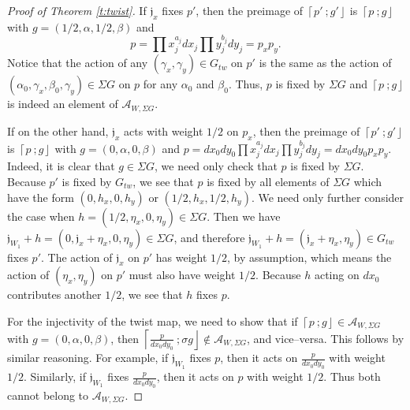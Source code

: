 \documentclass[10pt, letterpaper]{amsart}
\theoremstyle{remark}
\newcommand{\sA}{\mathscr{A}}
\newcommand{\fjrw}[2]{ \left\lceil #1 \:; #2 \right\rfloor }
\newcommand{\jw}{\mathfrak{j}}
\newcommand{\tw}[1]{{#1}_{tw}}
\newcommand{\s}[1]{\Sigma #1}
\begin{document}
\begin{proof}[Proof of Theorem \ref{t:twist}]
If $\jw_x$ fixes $p'$, then the preimage of $\fjrw{p'}{g'}$ is $\fjrw{p}{g}$ with $g=(1/2,\alpha,1/2,\beta)$ and $$p=\prod x_j^{a_j}dx_j \prod y_j^{b_j}dy_j = p_x p_y.$$ Notice that the action of any $(\gamma_x, \gamma_y) \in \tw{G}$ on $p'$ is the same as the action of $(\alpha_0,\gamma_x, \beta_0, \gamma_y)\in \s{G}$ on $p$ for any $\alpha_0$ and $\beta_0$.  Thus, $p$ is fixed by $\s{G}$ and $\fjrw{p}{g}$  is indeed an element of $\sA_{W,\s{G}}$.

If on the other hand, $\jw_x$ acts with weight $1/2$ on $p_x$, then the preimage of $\fjrw{p'}{g'}$ is $\fjrw{p}{g}$ with $g=(0,\alpha,0,\beta)$ and $p=dx_0 dy_0\prod x_j^{a_j}dx_j \prod y_j^{b_j}dy_j=dx_0 dy_0p_xp_y$. Indeed, it is clear that $g\in \s{G}$, we need only check that $p$ is fixed by $\s{G}$. Because $p'$ is fixed by $\tw{G}$, we see that $p$ is fixed by all elements of $\s{G}$ which have the form $(0,h_x,0,h_y)$ or $(1/2,h_x,1/2,h_y)$. We need only further consider the case when $h=(1/2,\eta_x,0,\eta_y)\in \s{G}$. Then we have $\jw_{W_1}+h=(0,\jw_x+\eta_x,0,\eta_y)\in \s{G}$, and therefore $\jw_{W_1}+h=(\jw_x+\eta_x,\eta_y)\in \tw{G}$ fixes $p'$. The action of $\jw_x$ on $p'$ has weight $1/2$, by assumption, which means the action of $(\eta_x, \eta_y)$ on $p'$ must also have weight $1/2$. Because $h$ acting on $dx_0$ contributes another $1/2$, we see that $h$ fixes $p$. 

For the injectivity of the twist map, we need to show that if $\fjrw{p}{g}\in \sA_{W,\s{G}}$ with $g=(0, \alpha, 0, \beta)$, then $\fjrw{\tfrac{p}{dx_0 dy_0}}{\sigma g}\notin \sA_{W,\s{G}}$, and vice--versa. This follows by similar reasoning. For example, if $\jw_{W_1}$ fixes $p$, then it acts on $\tfrac{p}{dx_0 dy_0}$ with weight $1/2$. Similarly, if  $\jw_{W_1}$ fixes $\tfrac{p}{dx_0 dy_0}$, then it acts on $p$ with weight $1/2$. Thus both cannot belong to $\sA_{W,\s{G}}$. 


\end{proof}
\end{document}
